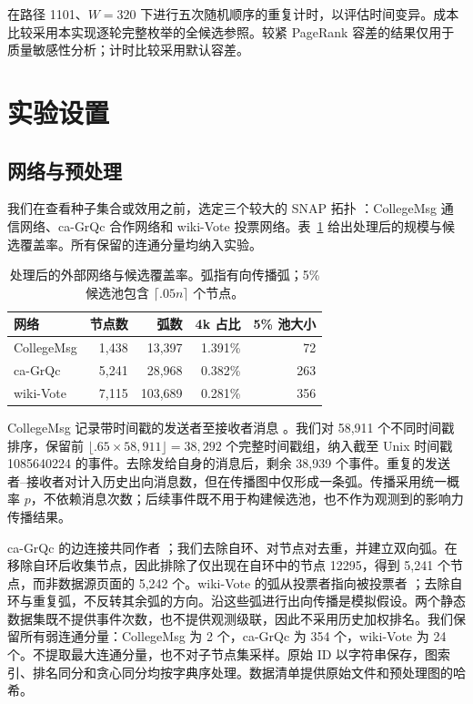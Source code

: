 \documentclass[smallextended]{svjour3}
\begin{document}
在路径 1101、$W=320$ 下进行五次随机顺序的重复计时，以评估时间变异。成本比较采用本实现逐轮完整枚举的全候选参照。较紧 PageRank 容差的结果仅用于质量敏感性分析；计时比较采用默认容差。

\section{实验设置}\label{sec:experimental-setup}
\subsection{网络与预处理}
我们在查看种子集合或效用之前，选定三个较大的 SNAP 拓扑 \cite{snap}：CollegeMsg 通信网络、ca-GrQc 合作网络和 wiki-Vote 投票网络。表~\ref{tab:data} 给出处理后的规模与候选覆盖率。所有保留的连通分量均纳入实验。
\begin{table}[htbp]
\caption{处理后的外部网络与候选覆盖率。弧指有向传播弧；5\% 候选池包含 $\lceil .05n\rceil$ 个节点。}\label{tab:data}
\begin{tabular}{lrrrr}
\toprule
网络 & 节点数 & 弧数 & 4k 占比 & 5\% 池大小 \\
\midrule
CollegeMsg & 1,438 & 13,397 & 1.391\% & 72 \\
ca-GrQc & 5,241 & 28,968 & 0.382\% & 263 \\
wiki-Vote & 7,115 & 103,689 & 0.281\% & 356 \\
\bottomrule
\end{tabular}
\end{table}

CollegeMsg 记录带时间戳的发送者至接收者消息 \cite{college}。我们对 58,911 个不同时间戳排序，保留前 $\lfloor .65\times58,911\rfloor=38,292$ 个完整时间戳组，纳入截至 Unix 时间戳 1085640224 的事件。去除发给自身的消息后，剩余 38,939 个事件。重复的发送者--接收者对计入历史出向消息数，但在传播图中仅形成一条弧。传播采用统一概率 $p$，不依赖消息次数；后续事件既不用于构建候选池，也不作为观测到的影响力传播结果。

ca-GrQc 的边连接共同作者 \cite{grqc}；我们去除自环、对节点对去重，并建立双向弧。在移除自环后收集节点，因此排除了仅出现在自环中的节点 12295，得到 5,241 个节点，而非数据源页面的 5,242 个。wiki-Vote 的弧从投票者指向被投票者 \cite{signed,links}；去除自环与重复弧，不反转其余弧的方向。沿这些弧进行出向传播是模拟假设。两个静态数据集既不提供事件次数，也不提供观测级联，因此不采用历史加权排名。我们保留所有弱连通分量：CollegeMsg 为 2 个，ca-GrQc 为 354 个，wiki-Vote 为 24 个。不提取最大连通分量，也不对子节点集采样。原始 ID 以字符串保存，图索引、排名同分和贪心同分均按字典序处理。数据清单提供原始文件和预处理图的哈希。
\end{document}
